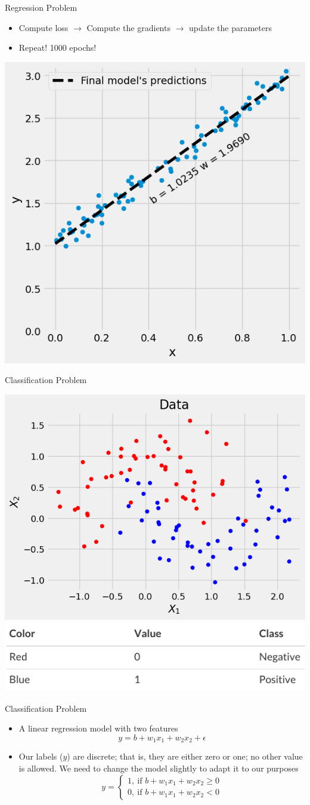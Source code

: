 \documentclass[pdflatex,compress,mathserif]{beamer}
\begin{document}
\begin{frame}{Regression Problem}
	\begin{itemize}
		\item Compute loss $\rightarrow$ Compute the gradients $\rightarrow$ update the parameters
		\item Repeat! 1000 epochs!
	\end{itemize}
	\begin{center}
		\includegraphics[width=0.5\linewidth]{img/14}
	\end{center}
\end{frame}

\begin{frame}{Classification Problem}
	\begin{center}
		\includegraphics[width=0.6\linewidth]{img/17}
		\includegraphics[width=0.6\linewidth]{img/18}
	\end{center}
\end{frame}

\begin{frame}{Classification Problem}
	\begin{itemize}
		\item A linear regression model with two features
		$$
		y = b + w_1x_1 + w_2x_2 + \epsilon
		$$
		\item Our labels ($y$) are discrete; that is, they are either zero or one; no other value is allowed. We need to change the model slightly to adapt it to our purposes
		$$
		y =
		\begin{cases}
			1,\ \text{if }b + w_1x_1 + w_2x_2 \ge 0
			\\
			0,\ \text{if }b + w_1x_1 + w_2x_2 < 0
		\end{cases}
		$$
	\end{itemize}
\end{frame}
\end{document}
